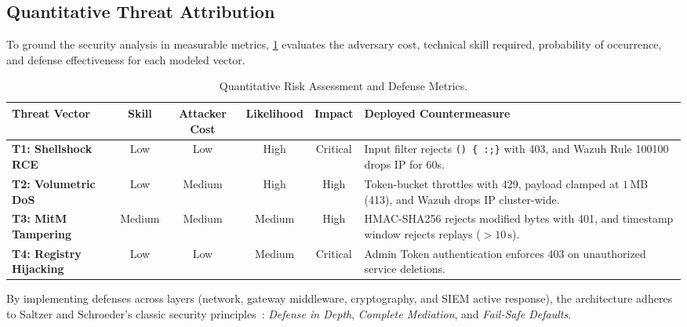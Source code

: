 \subsection{Quantitative Threat Attribution}
To ground the security analysis in measurable metrics, \cref{tab:threat_metrics} evaluates the adversary cost, technical skill required, probability of occurrence, and defense effectiveness for each modeled vector.

\begin{table}[H]
\centering
\small
\caption{Quantitative Risk Assessment and Defense Metrics.}
\label{tab:threat_metrics}
\begin{tabularx}{\textwidth}{lccccX}
\toprule
\textbf{Threat Vector} & \textbf{Skill} & \textbf{Attacker Cost} & \textbf{Likelihood} & \textbf{Impact} & \textbf{Deployed Countermeasure} \\
\midrule
\textbf{T1: Shellshock RCE} & Low & Low & High & Critical & Input filter rejects \texttt{() \{ :;\}} with 403, and Wazuh Rule 100100 drops IP for 60s. \\
\textbf{T2: Volumetric DoS} & Low & Medium & High & High & Token-bucket throttles with 429, payload clamped at $1\,\text{MB}$ (413), and Wazuh drops IP cluster-wide. \\
\textbf{T3: MitM Tampering} & Medium & Medium & Medium & High & HMAC-SHA256 rejects modified bytes with 401, and timestamp window rejects replays ($>10\,\text{s}$). \\
\textbf{T4: Registry Hijacking} & Low & Low & Medium & Critical & Admin Token authentication enforces 403 on unauthorized service deletions. \\
\bottomrule
\end{tabularx}
\end{table}

By implementing defenses across layers (network, gateway middleware, cryptography, and SIEM active response), the architecture adheres to Saltzer and Schroeder's classic security principles~\citep{saltzer1975protection}: \textit{Defense in Depth}, \textit{Complete Mediation}, and \textit{Fail-Safe Defaults}.
